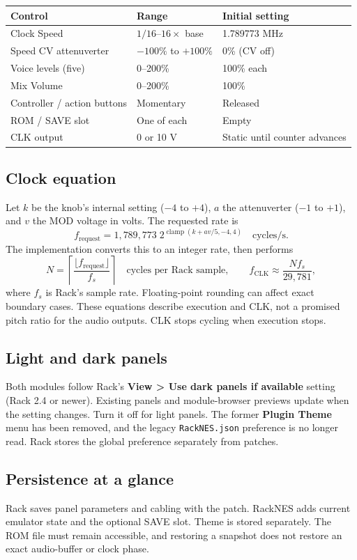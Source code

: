 \begin{tabularx}{\textwidth}{@{}p{}p{}X@{}}
\toprule
\textbf{Control} & \textbf{Range} & \textbf{Initial setting} \\
\midrule
Clock Speed & $1/16$--$16\times$ base & 1.789773 MHz \\
Speed CV attenuverter & $-100\%$ to $+100\%$ & 0\% (CV off) \\
Voice levels (five) & 0--200\% & 100\% each \\
Mix Volume & 0--200\% & 100\% \\
Controller / action buttons & Momentary & Released \\
ROM / SAVE slot & One of each & Empty \\
CLK output & 0 or 10 V & Static until counter advances \\
\bottomrule
\end{tabularx}

\subsection{Clock equation}
Let $k$ be the knob's internal setting ($-4$ to $+4$), $a$ the attenuverter
($-1$ to $+1$), and $v$ the MOD voltage in volts. The requested rate is
\[
f_{\mathrm{request}}=1{,}789{,}773\;2^{\operatorname{clamp}(k+av/5,-4,4)}
\quad\text{cycles/s}.
\]
The implementation converts this to an integer rate, then performs
\[
N=\left\lceil\frac{\lfloor f_{\mathrm{request}}\rfloor}{f_s}\right\rceil
\quad\text{cycles per Rack sample},\qquad
f_{\mathrm{CLK}}\approx\frac{Nf_s}{29{,}781},
\]
where $f_s$ is Rack's sample rate. Floating-point rounding can affect exact
boundary cases. These equations describe execution and CLK, not a promised
pitch ratio for the audio outputs. CLK stops cycling when execution stops.

\subsection{Light and dark panels}
Both modules follow Rack's \textbf{View > Use dark panels if available}
setting (Rack 2.4 or newer). Existing panels and module-browser previews
update when the setting changes. Turn it off for light panels.
The former \textbf{Plugin Theme} menu has been removed, and the legacy
\texttt{RackNES.json} preference is no longer read. Rack stores the global
preference separately from patches.

\subsection{Persistence at a glance}
Rack saves panel parameters and cabling with the patch. RackNES adds current
emulator state and the optional SAVE slot. Theme is stored separately.
The ROM file must remain accessible, and restoring a snapshot does not
restore an exact audio-buffer or clock phase.
